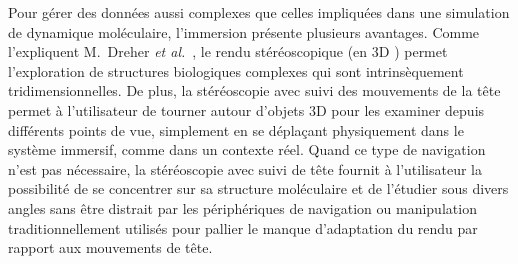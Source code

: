 %	
%	    
	
	Pour gérer des données aussi complexes que celles impliquées dans une simulation de dynamique moléculaire, l'immersion présente plusieurs avantages. Comme l'expliquent M.~Dreher \emph{et al.}~\cite{dreher2014exaviz}, le rendu stéréoscopique (\og en 3D \fg{}) permet l'exploration de structures biologiques complexes qui sont intrinsèquement tridimensionnelles. De plus, la stéréoscopie avec suivi des mouvements de la tête permet à l'utilisateur de tourner autour d'objets 3D pour les examiner depuis différents points de vue, simplement en se déplaçant physiquement dans le système immersif, comme dans un contexte réel. Quand ce type de navigation n'est pas nécessaire, la stéréoscopie avec suivi de tête fournit à l'utilisateur la possibilité de se concentrer sur sa structure moléculaire et de l'étudier sous divers angles sans être distrait par les périphériques de navigation ou manipulation traditionnellement utilisés pour pallier le manque d'adaptation du rendu par rapport aux mouvements de tête.
	
